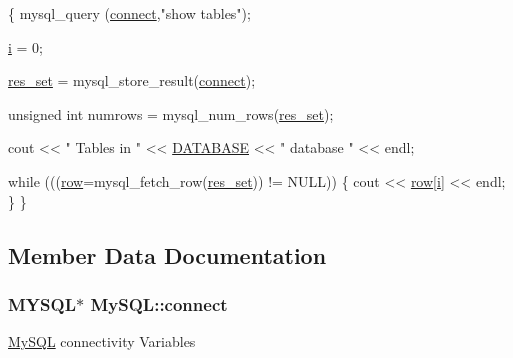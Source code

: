 \begin{DoxyCode}
\{
    mysql\_query (\hyperlink{classMySQL_a56a2a9159f6d46d8b3bd648e1f08e2b1}{connect},\textcolor{stringliteral}{"show tables"});                              
                                                                          
    \hyperlink{classMySQL_ad7a1cc7a8e202d4d19468731ed22d74a}{i} = 0;
                                                                         
    \hyperlink{classMySQL_abfe0a8f3fe7af0a582be5882f0afe69d}{res\_set} = mysql\_store\_result(\hyperlink{classMySQL_a56a2a9159f6d46d8b3bd648e1f08e2b1}{connect});                       
             
                                                                          
    \textcolor{keywordtype}{unsigned} \textcolor{keywordtype}{int} numrows = mysql\_num\_rows(\hyperlink{classMySQL_abfe0a8f3fe7af0a582be5882f0afe69d}{res\_set});                   
                                                                          
    cout << \textcolor{stringliteral}{" Tables in "} << \hyperlink{database-detail_8h_a39dc88d73783e112dbfcf98adbdbefa6}{DATABASE} << \textcolor{stringliteral}{" database "} << endl;        
                                                                         
    \textcolor{keywordflow}{while} (((\hyperlink{classMySQL_a56c73e3942ca040f13164e957a41a340}{row}=mysql\_fetch\_row(\hyperlink{classMySQL_abfe0a8f3fe7af0a582be5882f0afe69d}{res\_set})) != NULL))
    \{                                                                 
        cout << \hyperlink{classMySQL_a56c73e3942ca040f13164e957a41a340}{row}[\hyperlink{classMySQL_ad7a1cc7a8e202d4d19468731ed22d74a}{i}] << endl;                                       
    \}
\}
\end{DoxyCode}


\subsection{Member Data Documentation}
\hypertarget{classMySQL_a56a2a9159f6d46d8b3bd648e1f08e2b1}{
\subsubsection[{connect}]{\setlength{\rightskip}{0pt plus 5cm}M\-Y\-S\-Q\-L$\ast$ My\-S\-Q\-L\-::connect\hspace{0.3cm}{\ttfamily [protected]}}}\label{classMySQL_a56a2a9159f6d46d8b3bd648e1f08e2b1}
\hyperlink{classMySQL}{My\-S\-Q\-L} connectivity Variables 

